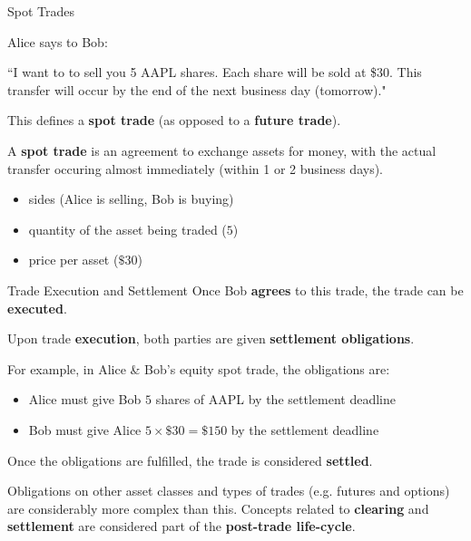 \begin{frame}{Spot Trades}
  \begin{sqt:tip}
    Alice says to Bob:
    \begin{center}
      ``I want to to sell you 5 AAPL shares. Each share will be sold at \$30. 
      This transfer will occur by the end of the next business day (tomorrow)." 
    \end{center}
  \end{sqt:tip}

  This defines a \textbf{spot trade} (as opposed to a \textbf{future trade}).

  \begin{sqt:definition}
    A \textbf{spot trade} is an agreement to exchange assets for money, with 
    the actual transfer occuring almost immediately (within 1 or 2 business days).
    \begin{itemize}
      \item sides (Alice is selling, Bob is buying)
      \item quantity of the asset being traded ($5$)
      \item price per asset ($\$30$)
    \end{itemize}
  \end{sqt:definition}
\end{frame}

\begin{frame}{Trade Execution and Settlement}
  Once Bob \textbf{agrees} to this trade, the trade can be \textbf{executed}.

  \begin{sqt:definition}
    Upon trade \textbf{execution}, both parties are given \textbf{settlement obligations}.
  \end{sqt:definition}
  \begin{sqt:tip}
    For example, in Alice \& Bob's equity spot trade, the obligations are:
    \begin{itemize}
      \item Alice must give Bob $5$ shares of AAPL by the settlement deadline
      \item Bob must give Alice $5\times \$30 = \$150$ by the settlement deadline
    \end{itemize}
    Once the obligations are fulfilled, the trade is considered \textbf{settled}.
  \end{sqt:tip}

  Obligations on other asset classes and types of trades (e.g. futures and options) 
  are considerably more complex than this.
  Concepts related to \textbf{clearing} and \textbf{settlement} are 
  considered part of the \textbf{post-trade life-cycle}.
\end{frame}

